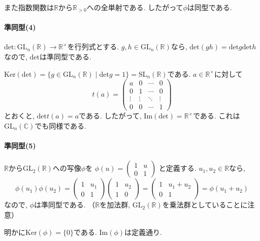 また指数関数は$\mathbb{R}$から$\mathbb{R}_{>0}$への全単射である.
したがって$\phi$は同型である.\newline

\paragraph*{準同型(4)}
$\mathrm{det}:\mathrm{GL}_n(\mathbb{R}) \to \mathbb{R}^\times$を行列式とする.
$g,h \in \mathrm{GL}_n(\mathbb{R})$なら,
$\mathrm{det}(gh)=\mathrm{det}g\mathrm{det}h$なので,
$\mathrm{det}$は準同型である.

$\mathrm{Ker}(\mathrm{det}) 
= \{g \in \mathrm{GL}_n(\mathbb{R}) \mid \mathrm{det}g=1\}
=\mathrm{SL}_n(\mathbb{R})$である. $a \in \mathbb{R}^\times$に対して
\[ t(a) = \begin{pmatrix}  a & 0 & \cdots & 0 \\
0 & 1 & \cdots & 0 \\
\vdots & \vdots & \ddots & \vdots \\
0 & 0 & \cdots & 1 \end{pmatrix} \]
とおくと, $\mathrm{det} t(a)=a$である.
したがって, $\mathrm{Im}(\mathrm{det})=\mathbb{R}^\times$である.
これは$\mathrm{GL}_n(\mathbb{C})$でも同様である.\newline

\paragraph*{準同型(5)}
$\mathbb{R}$から$\mathrm{GL}_2(\mathbb{R})$への写像$\phi$を
$\phi(u)=\begin{pmatrix} 1 & u \\ 0 & 1 \end{pmatrix}$
と定義する.
$u_1,u_2 \in \mathbb{R}$なら,
\[\phi(u_1)\phi(u_2) = \begin{pmatrix} 1&u_1 \\ 0&1 \end{pmatrix} 
\begin{pmatrix} 1&u_2 \\ 1&0 \end{pmatrix} 
= \begin{pmatrix} 1& u_1+u_2 \\ 0&1 \end{pmatrix} = \phi(u_1+u_2)\]
なので, $\phi$は準同型である.
（$\mathbb{R}$を加法群, $\mathrm{GL}_2(\mathbb{R})$を乗法群としていることに注意）

明かに$\mathrm{Ker}(\phi)=\{0\}$である. $\mathrm{Im}(\phi)$は定義通り.
\newline

